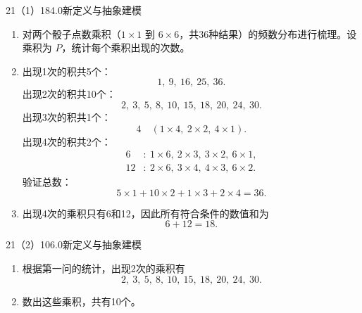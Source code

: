 \begin{solution}{21（1）}{18}{4.0}{新定义与抽象建模}
\begin{enumerate}[label=\textbf{Step \arabic*:},leftmargin=*]
  \item 对两个骰子点数乘积（\(1\times1\) 到 \(6\times6\)，共36种结果）的频数分布进行梳理。设乘积为 \(P\)，统计每个乘积出现的次数。
  \item 出现1次的积共5个：
  \[
    1,\ 9,\ 16,\ 25,\ 36.
  \]
  出现2次的积共10个：
  \[
    2,\ 3,\ 5,\ 8,\ 10,\ 15,\ 18,\ 20,\ 24,\ 30.
  \]
  出现3次的积共1个：
  \[
    4\quad(1\times4,\ 2\times2,\ 4\times1).
  \]
  出现4次的积共2个：
  \[
  \begin{aligned}
    6&:\ 1\times6,\ 2\times3,\ 3\times2,\ 6\times1,\\
    12&:\ 2\times6,\ 3\times4,\ 4\times3,\ 6\times2.
  \end{aligned}
  \]
  验证总数：
  \[
    5\times1+10\times2+1\times3+2\times4=36.
  \]
  \item 出现4次的乘积只有6和12，因此所有符合条件的数值和为
  \[
    6+12=18.
  \]
\end{enumerate}
\end{solution}

\begin{solution}{21（2）}{10}{6.0}{新定义与抽象建模}
\begin{enumerate}[label=\textbf{Step \arabic*:},leftmargin=*]
  \item 根据第一问的统计，出现2次的乘积有
  \[
    2,\ 3,\ 5,\ 8,\ 10,\ 15,\ 18,\ 20,\ 24,\ 30.
  \]
  \item 数出这些乘积，共有10个。
\end{enumerate}
\end{solution}

